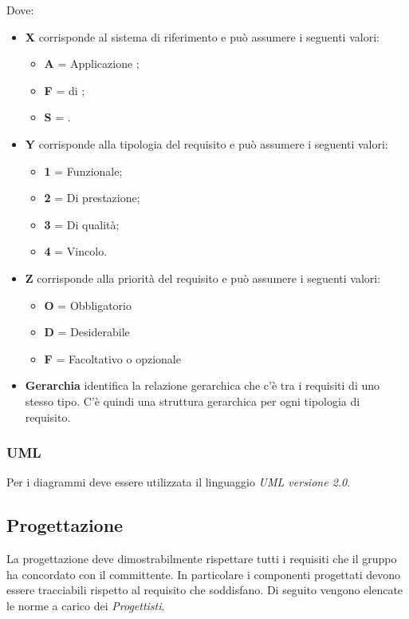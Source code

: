 Dove:
\begin{itemize}
 \item \textbf{X} corrisponde al sistema di riferimento e può assumere i seguenti valori:
    \begin{itemize}
     \item[] \textbf{A} = Applicazione ;
     \item[] \textbf{F} =  di ;
     \item[] \textbf{S} = .
    \end{itemize}

 \item \textbf{Y} corrisponde alla tipologia del requisito e può assumere i seguenti valori:
    \begin{itemize}
     \item[] \textbf{1} = Funzionale;
     \item[] \textbf{2} = Di prestazione;
     \item[] \textbf{3} = Di qualità;
     \item[] \textbf{4} = Vincolo.
    \end{itemize}

 \item \textbf{Z} corrisponde alla priorità del requisito e può assumere i seguenti valori:
    \begin{itemize}
     \item[] \textbf{O} = Obbligatorio
     \item[] \textbf{D} = Desiderabile
     \item[] \textbf{F} = Facoltativo o opzionale
    \end{itemize}

 \item \textbf{Gerarchia} identifica la relazione gerarchica che c'è tra i requisiti di uno stesso tipo. C'è quindi una struttura gerarchica per ogni tipologia di requisito.
\end{itemize}

\subsubsection{UML}

Per i diagrammi deve essere utilizzata il linguaggio \emph{UML versione 2.0}.


\subsection{Progettazione}
La progettazione deve dimostrabilmente rispettare tutti i requisiti che il gruppo ha concordato con il committente. In particolare i componenti progettati devono essere tracciabili rispetto al requisito che soddisfano.
Di seguito vengono elencate le norme a carico dei \emph{Progettisti}.

